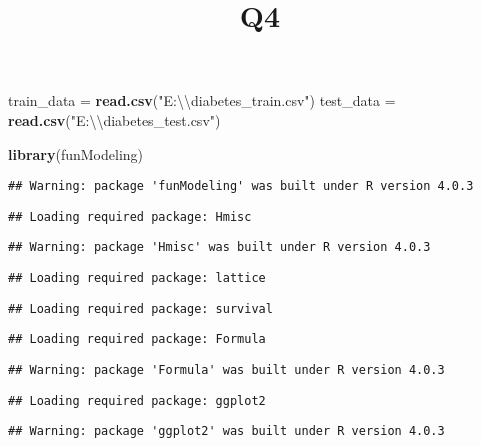 \documentclass[
]{article}
\title{Q4}
\author{}
\date{\vspace{-2.5em}}
\newenvironment{Shaded}{\begin{snugshade}}{\end{snugshade}}
\newcommand{\CharTok}[1]{\textcolor[rgb]{0.31,0.60,0.02}{#1}}
\newcommand{\KeywordTok}[1]{\textcolor[rgb]{0.13,0.29,0.53}{\textbf{#1}}}
\newcommand{\NormalTok}[1]{#1}
\newcommand{\StringTok}[1]{\textcolor[rgb]{0.31,0.60,0.02}{#1}}
\begin{document}
\maketitle

\begin{Shaded}
\begin{Highlighting}[]
\NormalTok{train_data =}\StringTok{ }\KeywordTok{read.csv}\NormalTok{(}\StringTok{"E:}\CharTok{\textbackslash{}\textbackslash{}}\StringTok{diabetes_train.csv"}\NormalTok{)}
\NormalTok{test_data =}\StringTok{ }\KeywordTok{read.csv}\NormalTok{(}\StringTok{"E:}\CharTok{\textbackslash{}\textbackslash{}}\StringTok{diabetes_test.csv"}\NormalTok{)}

\KeywordTok{library}\NormalTok{(funModeling) }
\end{Highlighting}
\end{Shaded}

\begin{verbatim}
## Warning: package 'funModeling' was built under R version 4.0.3
\end{verbatim}

\begin{verbatim}
## Loading required package: Hmisc
\end{verbatim}

\begin{verbatim}
## Warning: package 'Hmisc' was built under R version 4.0.3
\end{verbatim}

\begin{verbatim}
## Loading required package: lattice
\end{verbatim}

\begin{verbatim}
## Loading required package: survival
\end{verbatim}

\begin{verbatim}
## Loading required package: Formula
\end{verbatim}

\begin{verbatim}
## Warning: package 'Formula' was built under R version 4.0.3
\end{verbatim}

\begin{verbatim}
## Loading required package: ggplot2
\end{verbatim}

\begin{verbatim}
## Warning: package 'ggplot2' was built under R version 4.0.3
\end{verbatim}
\end{document}
